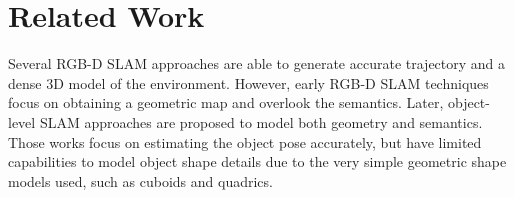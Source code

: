 \section{Related Work}
\label{sec:review}


Several RGB-D SLAM approaches \cite{newcombe2011kinectfusion, endres2012evaluation, kerl2013dense, endres20133, whelan2016elasticfusion} are able to generate accurate trajectory and a dense 3D model of the environment. However, early RGB-D SLAM techniques focus on obtaining a geometric map and overlook the semantics. 
Later, object-level SLAM approaches \cite{nicholson2018quadricslam, yang2019cubeslam} are proposed to model both geometry and semantics. Those works focus on estimating the object pose accurately, but have limited capabilities to model object shape details due to the very simple geometric shape models used, such as cuboids and quadrics.  


